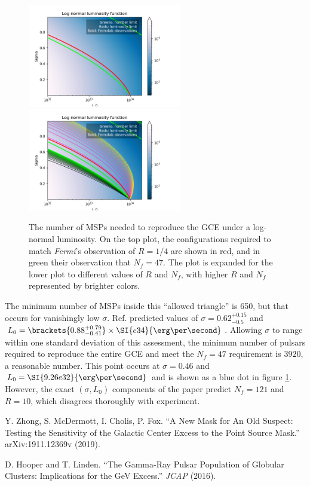 \documentclass{C://Aliases//Dropbox-MIT//Latex_Templates//personal}
\begin{document}
\begin{figure}[h]
    \label{contour-overlay-log-normal}
    \centering
    \includegraphics[width=0.6\textwidth]{../../luminosity-models/log-normal/contour-overlay.png}
    \includegraphics[width=0.6\textwidth]{../../luminosity-models/log-normal/contour-overlay-extra.png}
    \caption{The number of MSPs needed to reproduce the GCE under a log-normal luminosity. On the top plot, the configurations required to match \textit{Fermi}'s observation of $R=1/4$ are shown in red, and in green their observation that $N_f = 47$. The plot is expanded for the lower plot to different values of $R$ and $N_f$, with higher $R$ and $N_f$ represented by brighter colors.}
\end{figure}

The minimum number of MSPs inside this ``allowed triangle'' is 650, but that occurs for vanishingly low $\sigma$. Ref. \cite{log-normal} predicted values of $\sigma = 0.62^{+0.15}_{-0.5}$ and $L_0 = \brackets{0.88^{+0.79}_{-0.41}}\times\SI{e34}{\erg\per\second}$. Allowing $\sigma$ to range within one standard deviation of this assessment, the minimum number of pulsars required to reproduce the entire GCE and meet the $N_f=47$ requirement is $3920$, a reasonable number. This point occurs at $\sigma = 0.46$ and $L_0 = \SI{9.26e32}{\erg\per\second}$ and is shown as a blue dot in figure \ref{contour-overlay-log-normal}. However, the exact $(\sigma, L_0)$ components of the paper predict $N_f=121$ and $R=10$, which disagrees thoroughly with experiment.



\begin{thebibliography}{99}
    Y. Zhong, S. McDermott, I. Cholis, P. Fox. ``A New Mask for An Old Suspect: Testing the Sensitivity of the Galactic Center Excess to the Point Source Mask.'' arXiv:1911.12369v (2019).

    D. Hooper and T. Linden. ``The Gamma-Ray Pulsar Population of
    Globular Clusters: Implications for the
    GeV Excess.'' \textit{JCAP} (2016).

\end{thebibliography}
\end{document}
